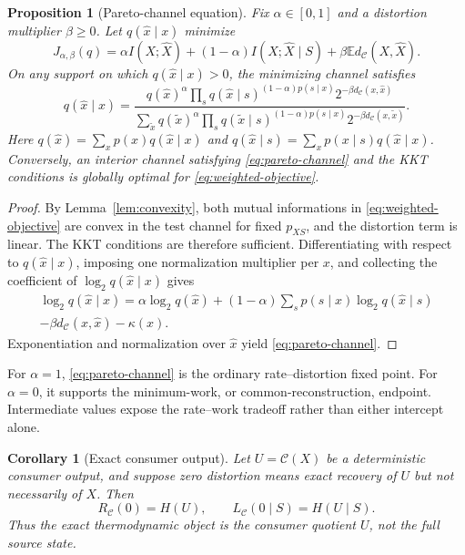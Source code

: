 \documentclass[letterpaper,onecolumn]{IEEEtran}
\newtheorem{proposition}{Proposition}
\newtheorem{corollary}{Corollary}
\theoremstyle{definition}
\theoremstyle{remark}
\newcommand{\E}{\mathbb{E}}
\newcommand{\cC}{\mathcal{C}}
\newcommand{\hX}{\widehat{X}}
\newcommand{\1}{\mathbf{1}}
\begin{document}
\begin{proposition}[Pareto-channel equation]\label{prop:pareto-channel}
Fix $\alpha\in[0,1]$ and a distortion multiplier $\beta\ge0$. Let
$q(\hat x\mid x)$ minimize
\begin{equation}
 J_{\alpha,\beta}(q)
 =\alpha I(X;\hX)+(1-\alpha)I(X;\hX\mid S)
  +\beta\E d_{\cC}(X,\hX).
 \label{eq:weighted-objective}
\end{equation}
On any support on which $q(\hat x\mid x)>0$, the minimizing channel satisfies
\begin{equation}
\boxed{
 q(\hat x\mid x)
 =\frac{
 q(\hat x)^{\alpha}
 \displaystyle\prod_s q(\hat x\mid s)^{(1-\alpha)p(s\mid x)}
 2^{-\beta d_{\cC}(x,\hat x)}}
 {\displaystyle\sum_{\tilde x}
 q(\tilde x)^{\alpha}
 \prod_s q(\tilde x\mid s)^{(1-\alpha)p(s\mid x)}
 2^{-\beta d_{\cC}(x,\tilde x)}}.}
 \label{eq:pareto-channel}
\end{equation}
Here $q(\hat x)=\sum_xp(x)q(\hat x\mid x)$ and
$q(\hat x\mid s)=\sum_xp(x\mid s)q(\hat x\mid x)$. Conversely, an interior
channel satisfying \eqref{eq:pareto-channel} and the KKT conditions is globally
optimal for \eqref{eq:weighted-objective}.
\end{proposition}

\begin{proof}
By Lemma~\ref{lem:convexity}, both mutual informations in
\eqref{eq:weighted-objective} are convex in the test channel for fixed
$p_{XS}$, and the distortion term is linear. The KKT conditions are therefore
sufficient. Differentiating with respect to
$q(\hat x\mid x)$, imposing one normalization multiplier per $x$, and collecting
the coefficient of $\log_2 q(\hat x\mid x)$ gives
\begin{multline}
 \log_2 q(\hat x\mid x)
 =\alpha\log_2 q(\hat x)
 +(1-\alpha)\sum_s p(s\mid x)\log_2 q(\hat x\mid s)\\
 -\beta d_{\cC}(x,\hat x)-\kappa(x).
\end{multline}
Exponentiation and normalization over $\hat x$ yield
\eqref{eq:pareto-channel}.
\end{proof}

For $\alpha=1$, \eqref{eq:pareto-channel} is the ordinary
rate--distortion fixed point. For $\alpha=0$, it supports the minimum-work, or
common-reconstruction, endpoint. Intermediate values expose the rate--work
tradeoff rather than either intercept alone.

\begin{corollary}[Exact consumer output]\label{cor:exact-output}
Let $U=\cC(X)$ be a deterministic consumer output, and suppose zero distortion
means exact recovery of $U$ but not necessarily of $X$. Then
\begin{equation}
 R_{\cC}(0)=H(U),
 \qquad
 L_{\cC}(0\mid S)=H(U\mid S).
 \label{eq:exact-output}
\end{equation}
Thus the exact thermodynamic object is the consumer quotient $U$, not the full
source state.
\end{corollary}
\end{document}
